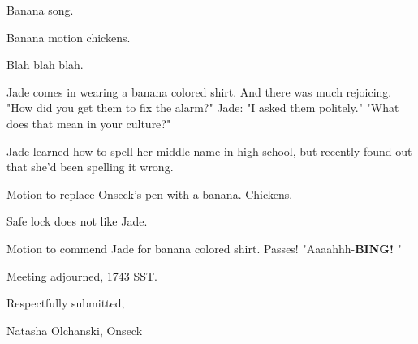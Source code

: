 \documentclass[12pt]{article}
\newcommand{\bing}{{\bf BING!} }
\begin{document}
Banana song.

Banana motion chickens.

Blah blah blah.

Jade comes in wearing a banana colored shirt. And there was much rejoicing. "How did you get them to fix the alarm?" Jade: "I asked them politely." "What does that mean in your culture?"

Jade learned how to spell her middle name in high school, but recently found out that she'd been spelling it wrong.

Motion to replace Onseck's pen with a banana. Chickens.

Safe lock does not like Jade.

Motion to commend Jade for banana colored shirt. Passes! "Aaaahhh-\bing"

\vspace{12pt}

\noindent
Meeting adjourned, 1743 SST.

\vspace{18pt}

\centerline{Respectfully submitted,}
\centerline{Natasha Olchanski, Onseck}
\end{document}
